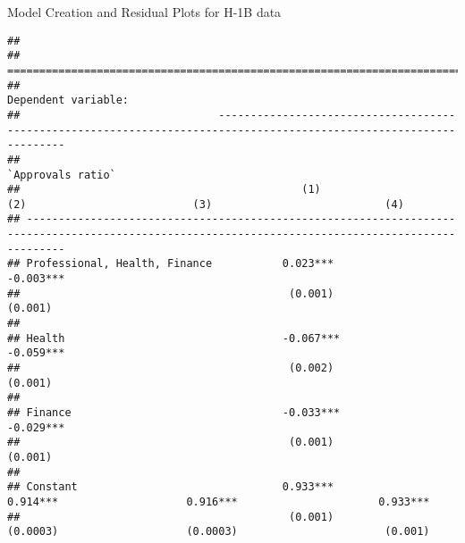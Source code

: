 \documentclass[
  ignorenonframetext,
]{beamer}
\begin{document}
\begin{frame}[fragile]{Model Creation and Residual Plots for H-1B data}
\begin{verbatim}
## 
## ==================================================================================================================================================
##                                                                               Dependent variable:                                                 
##                               --------------------------------------------------------------------------------------------------------------------
##                                                                                `Approvals ratio`                                                  
##                                            (1)                         (2)                          (3)                           (4)             
## --------------------------------------------------------------------------------------------------------------------------------------------------
## Professional, Health, Finance           0.023***                    -0.003***                                                                     
##                                          (0.001)                     (0.001)                                                                      
##                                                                                                                                                   
## Health                                  -0.067***                                                -0.059***                                        
##                                          (0.002)                                                  (0.001)                                         
##                                                                                                                                                   
## Finance                                 -0.033***                                                                              -0.029***          
##                                          (0.001)                                                                                (0.001)           
##                                                                                                                                                   
## Constant                                0.933***                     0.914***                    0.916***                      0.933***           
##                                          (0.001)                     (0.0003)                    (0.0003)                       (0.001)           

\end{verbatim}
\end{frame}
\end{document}
